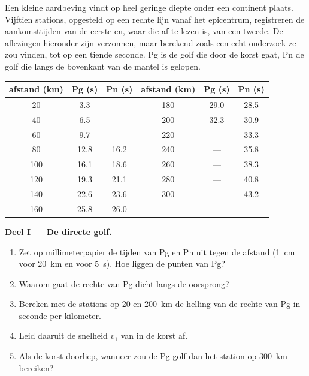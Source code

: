 \begin{problem}
\label{pb:g11:seismic-structure:1}
Een kleine aardbeving vindt op heel geringe diepte onder een continent plaats.
Vijftien stations, opgesteld op een rechte lijn vanaf het epicentrum, registreren
de aankomsttijden van de eerste  en, waar die af te lezen is, van een tweede.
De aflezingen hieronder zijn verzonnen, maar berekend zoals een echt onderzoek ze
zou vinden, tot op een tiende seconde. Pg is de golf die door de korst gaat, Pn de
golf die langs de bovenkant van de mantel is gelopen.

\begin{center}
\small
\begin{tabular}{|c|c|c||c|c|c|}
\hline
afstand (\unit{km}) & Pg (\unit{s}) & Pn (\unit{s}) & afstand (\unit{km}) & Pg (\unit{s}) & Pn (\unit{s}) \\ \hline
20 & 3.3 & --- & 180 & 29.0 & 28.5 \\ \hline
40 & 6.5 & --- & 200 & 32.3 & 30.9 \\ \hline
60 & 9.7 & --- & 220 & --- & 33.3 \\ \hline
80 & 12.8 & 16.2 & 240 & --- & 35.8 \\ \hline
100 & 16.1 & 18.6 & 260 & --- & 38.3 \\ \hline
120 & 19.3 & 21.1 & 280 & --- & 40.8 \\ \hline
140 & 22.6 & 23.6 & 300 & --- & 43.2 \\ \hline
160 & 25.8 & 26.0 & & & \\ \hline
\end{tabular}
\end{center}

\medskip
\noindent\textbf{Deel I --- De directe golf.}
\begin{enumerate}
  \item Zet op millimeterpapier de tijden van Pg en Pn uit tegen de afstand
        (\qty{1}{cm} voor \qty{20}{km} en voor \qty{5}{s}). Hoe liggen de punten van Pg?
  \item Waarom gaat de rechte van Pg dicht langs de oorsprong?
  \item Bereken met de stations op 20 en \qty{200}{km} de helling van de
        rechte van Pg in seconde per kilometer.
  \item Leid daaruit de snelheid $v_1$ van  in de korst af.
  \item Als de korst doorliep, wanneer zou de Pg-golf dan het station op
        \qty{300}{km} bereiken?
\end{enumerate}


\end{problem}
